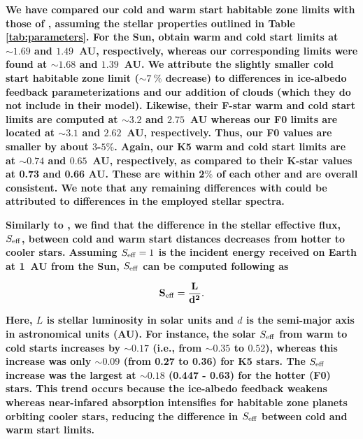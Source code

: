 \documentclass[fleqn,usenatbib]{mnras}
\providecommand{\DIFadd}[1]{{\bf #1}} %
\begin{document}
\DIFadd{We have compared our cold and warm start habitable zone limits with those of \citet{kadoya_outer_2019}, assuming the stellar properties outlined in Table \ref{tab:parameters}. For the Sun, \citet{kadoya_outer_2019} obtain warm and cold start limits at $\sim1.69$ and $1.49$~AU, respectively, whereas our corresponding limits were found at $\sim 1.68$ and $1.39$~AU. We
attribute the slightly smaller cold start habitable zone limit ($\sim 7~\%$ decrease) to differences in ice-albedo feedback parameterizations and our addition of clouds (which they do not include in their model).
Likewise, their F-star warm and cold start limits are computed at $\sim 3.2$ and $2.75$~AU whereas our F0 limits are located at $\sim 3.1$ and $2.62$~AU, respectively. Thus, our F0 values are smaller by  about $3$-$5\%$. Again, our K5 warm and cold start limits are at $\sim 0.74$ and $0.65$~AU, respectively, as compared to their K-star values at 0.73 and 0.66 AU. These are within 2$\%$ of each other and are overall consistent.  We note that any remaining differences with \citet{kadoya_outer_2019} could be attributed to differences in the employed stellar spectra.
}

\DIFadd{Similarly to \citet{kadoya_outer_2019}, we find that the difference in the stellar effective flux, $S_{\rm eff}$, between cold and warm start distances decreases from hotter to cooler stars. Assuming $S_{\rm eff}=1$ is the incident energy received on Earth at 1~AU from the Sun, $S_{\rm eff}$ can be computed following \citet{kasting1993} as
}

\begin{equation}
\DIFadd{S_{\rm eff} = \frac{L}{d^{2}}.
}\end{equation}

\DIFadd{Here, $L$ is stellar luminosity in solar units and $d$ is the semi-major axis in astronomical units (AU). For instance, the solar $S_{\rm eff}$ from warm to cold starts increases by $\sim 0.17$ (i.e., from $\sim 0.35$ to $0.52$), whereas this increase was only $\sim 0.09$ (from 0.27 to 0.36) for K5 stars. The $S_{\rm eff}$ increase was the largest at $\sim 0.18$ (0.447 - 0.63) for the hotter (F0) stars. This trend occurs because the ice-albedo feedback weakens whereas near-infared absorption intensifies for habitable zone planets orbiting cooler stars, reducing the difference in $S_{\rm eff}$ between cold and warm start limits. 
}
\end{document}
